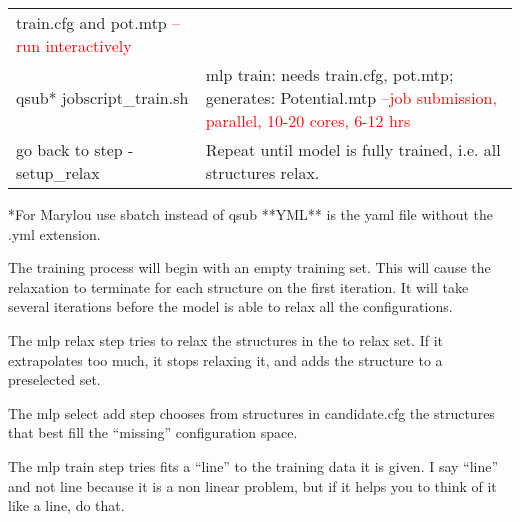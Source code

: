 \documentclass{article}
\begin{document}
\begin{center}
\begin{longtable}{||p{4cm}|p{7cm}||}
                    train.cfg and pot.mtp \textcolor{red}{--run interactively} \\
    qsub* jobscript\_train.sh & mlp train: needs train.cfg, pot.mtp;
                                generates: Potential.mtp \textcolor{red}{--job
                    submission, parallel, 10-20 cores, 6-12 hrs}\\
    go back to step -setup\_relax & Repeat until model is fully
                                    trained, i.e. all structures relax.\\
  \end{longtable}
\end{center}
*For Marylou use sbatch instead of qsub
**YML** is the yaml file without the .yml extension.

The training process will begin with an empty training set. This will
cause the relaxation to terminate for each structure on the first
iteration. It will take several iterations before the model is able to
relax all the configurations.

The mlp relax step tries to relax the structures in the to relax
set. If it extrapolates too much, it stops relaxing it, and adds the
structure to a preselected set.

The mlp select add step chooses from structures in candidate.cfg the
structures that best fill the ``missing'' configuration space.

The mlp train step tries fits a ``line'' to the training data it is
given. I say ``line'' and not line because it is a non linear problem,
but if it helps you to think of it like a line, do that. 
\end{document}
